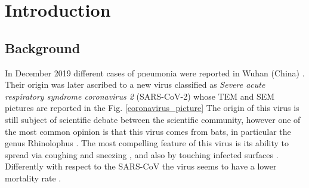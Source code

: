 \documentclass[
12pt, %
a4paper, %
oneside, %
headinclude,footinclude, %
BCOR5mm, %
]{scrartcl}
\begin{document}




\newpage %


\section{Introduction} \label{introduction}

\subsection{Background} \label{Background}
In December 2019 different cases of pneumonia were reported in Wuhan (China) \cite{huang2020clinical}. Their origin was later ascribed to a new virus classified as \textit{Severe acute respiratory syndrome coronavirus 2} (SARS-CoV-2) whose TEM and SEM pictures are reported in the Fig. \ref{coronavirus_picture} The origin of this virus is still subject of scientific debate between the scientific community, however one of the most common opinion is that this virus comes from bats, in particular the genus Rhinolophus \cite{zhou2020pneumonia}. The most compelling feature of this virus is its ability to spread via coughing and sneezing \cite{ghinai2020first}, and also by touching infected surfaces \cite{chang2020protecting}. Differently with respect to the SARS-CoV the virus seems to have a lower mortality rate \cite{sorensen2006severe,weiss2020clinical}.
\end{document}
